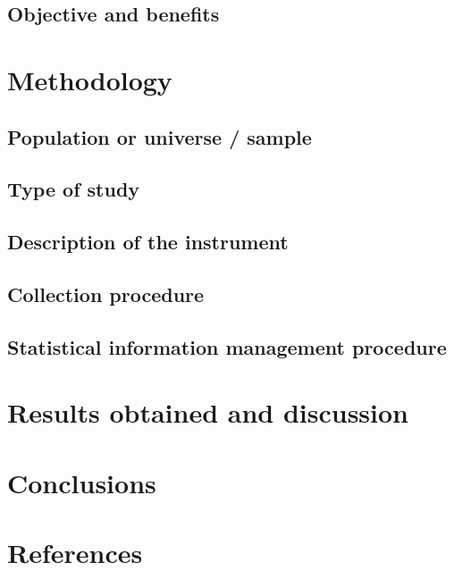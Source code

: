 \documentclass[preprint,12pt]{elsarticle}
\begin{document}
	\subsection{Objective and benefits}
\newpage
\section{Methodology}
	\subsection{Population or universe / sample}
	\subsection{Type of study}
	\subsection{Description of the instrument}
	\subsection{Collection procedure}
	\subsection{Statistical information management procedure}

\newpage
\section{Results obtained and discussion}

\newpage
\section{Conclusions}

\newpage
\section{References}

\end{document}
